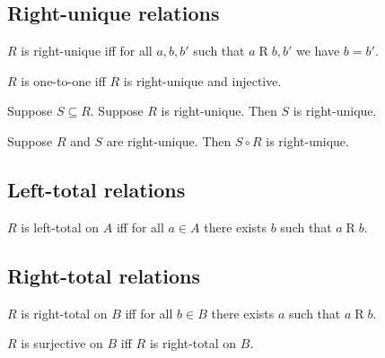 \subsection{Right-unique relations}

\begin{definition}\label{rightunique}
    $R$ is right-unique iff
    for all $a,b,b'$ such that $a\mathrel{R} b, b'$ we have $b = b'$.
\end{definition}

\begin{abbreviation}\label{onetoone}
    $R$ is one-to-one iff $R$ is right-unique and injective.
\end{abbreviation}

\begin{proposition}\label{subseteq_of_rightunique_is_rightunique}
    Suppose $S\subseteq R$.
    Suppose $R$ is right-unique.
    Then $S$ is right-unique.
\end{proposition}

\begin{proposition}\label{circ_rightunique}
    Suppose $R$ and $S$ are right-unique.
    Then $S\circ R$ is right-unique.
\end{proposition}



\subsection{Left-total relations}

\begin{definition}\label{lefttotal}
    $R$ is left-total on $A$ iff
    for all $a\in A$ there exists $b$ such that $a\mathrel{R} b$.
\end{definition}


\subsection{Right-total relations}

\begin{definition}\label{righttotal}
    $R$ is right-total on $B$ iff
    for all $b\in B$ there exists $a$ such that $a\mathrel{R} b$.
\end{definition}

\begin{abbreviation}\label{surjective}
    $R$ is surjective on $B$ iff $R$ is right-total on $B$.
\end{abbreviation}
